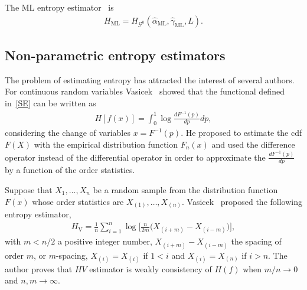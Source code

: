 \documentclass[journal]{IEEEtran}
\begin{document}
	The ML entropy estimator~\cite{CaseBerg01} is
	\begin{align}
		H_\text{ML}=H_{\mathcal G^0}(\widehat{\alpha}_{\text{ML}},\widehat{\gamma}_{\text{ML}},L).
	\end{align}
	
	
	
	
	\subsection{Non-parametric entropy estimators}
	\label{Hest}
	
	The problem of estimating entropy has attracted the interest of several authors. For continuous random variables Vasicek~\cite{Vasicek76} showed that the functional defined in~\eqref{SE} can be written as
	\begin{align}
	H[f(x)]=\int_{0}^{1} \log \frac{d F^{-1}(p)}{d p} d p,
	\end{align}
	considering the change of variables $x=F^{-1}(p).$
	He proposed to estimate the cdf $F(X)$ with the empirical distribution function $F_n(x)$ and used the difference operator instead of the differential operator in order to approximate the $\frac{d F^{-1}(p)}{d p}$ by a function of the order statistics.
	
	Suppose that $X_1,\dots,X_n$ be a random sample from the distribution function $F(x)$ whose order statistics are $X_{(1)}, \ldots, X_{(n)}$. 
	Vasicek~\cite{Vasicek76} proposed the following entropy estimator,
	\begin{align}
	\label{HV}
		H_{\text{V}}=\frac{1}{n} \sum_{i=1}^{n} \log \Big[\frac{n}{2 m}\big(X_{(i+m)}-X_{(i-m)}\big)\Big], 
	\end{align}
	with $m<n/2$ a positive integer number, $X_{(i+m)}-X_{(i-m)}$ the spacing of order $m$, or $m$-spacing, $X_{(i)}=X_{(i)}$ if $1<i$ and $X_{(i)}=X_{(n)}$ if $i>n$.
	The author proves that $HV$ estimator is weakly consistency of $H(f)$ when $m/n \to 0$ and $n,m \to \infty$.
	
\end{document}
